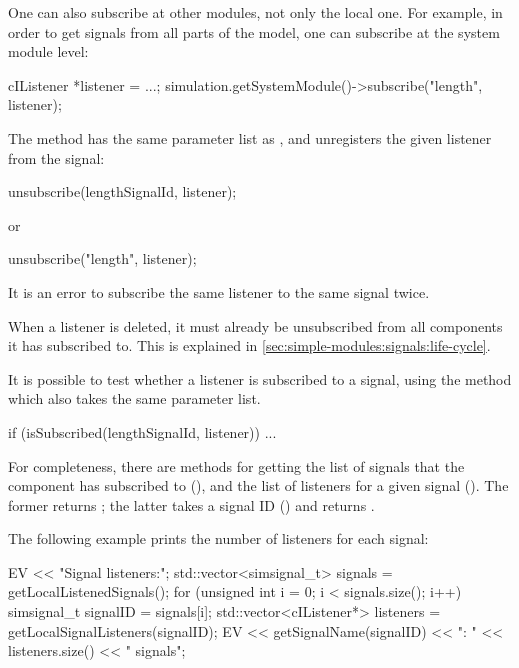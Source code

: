 One can also subscribe at other modules, not only the local one.
For example, in order to get signals from all parts of the model,
one can subscribe at the system module level:

\begin{cpp}
cIListener *listener = ...;
simulation.getSystemModule()->subscribe("length", listener);
\end{cpp}

The  method has the same parameter list
as , and unregisters the given listener
from the signal:

\begin{cpp}
unsubscribe(lengthSignalId, listener);
\end{cpp}

or

\begin{cpp}
unsubscribe("length", listener);
\end{cpp}

It is an error to subscribe the same listener to the same
signal twice.

\begin{note}
  When a listener is deleted, it must already be unsubscribed from
  all components it has subscribed to. This is explained in
  \ref{sec:simple-modules:signals:life-cycle}.
\end{note}

It is possible to test whether a listener is subscribed to a signal,
using the  method which also takes the same
parameter list.

\begin{cpp}
if (isSubscribed(lengthSignalId, listener))
{
    ...
}
\end{cpp}

For completeness, there are methods for getting the list of signals
that the component has subscribed to (),
and the list of listeners for a given signal ().
The former returns ; the latter takes
a signal ID () and returns .

The following example prints the number of listeners for each signal:

\begin{cpp}
EV << "Signal listeners:\n";
std::vector<simsignal_t> signals = getLocalListenedSignals();
for (unsigned int i = 0; i < signals.size(); i++) {
    simsignal_t signalID = signals[i];
    std::vector<cIListener*> listeners = getLocalSignalListeners(signalID);
    EV << getSignalName(signalID) << ": " << listeners.size() << " signals\n";
}
\end{cpp}

